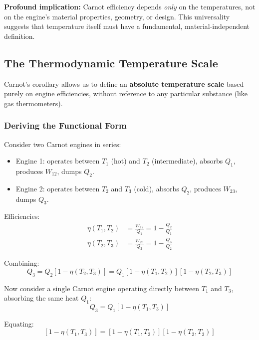 \documentclass[9pt,twocoloumn]{article}
\begin{document}
\textbf{Profound implication:} Carnot efficiency depends \emph{only} on the temperatures, not on the engine's material properties, geometry, or design. This universality suggests that temperature itself must have a fundamental, material-independent definition.

\subsection{The Thermodynamic Temperature Scale}

Carnot's corollary allows us to define an \textbf{absolute temperature scale} based purely on engine efficiencies, without reference to any particular substance (like gas thermometers).

\subsubsection{Deriving the Functional Form}

Consider two Carnot engines in series:
\begin{itemize}
    \item Engine 1: operates between $T_1$ (hot) and $T_2$ (intermediate), absorbs $Q_1$, produces $W_{12}$, dumps $Q_2$.
    \item Engine 2: operates between $T_2$ and $T_3$ (cold), absorbs $Q_2$, produces $W_{23}$, dumps $Q_3$.
\end{itemize}

Efficiencies:
\begin{align}
\eta(T_1, T_2) &= \frac{W_{12}}{Q_1} = 1 - \frac{Q_2}{Q_1} \\
\eta(T_2, T_3) &= \frac{W_{23}}{Q_2} = 1 - \frac{Q_3}{Q_2}
\end{align}

Combining:
\begin{equation}
Q_3 = Q_2 [1 - \eta(T_2, T_3)] = Q_1 [1 - \eta(T_1, T_2)] [1 - \eta(T_2, T_3)]
\end{equation}

Now consider a single Carnot engine operating directly between $T_1$ and $T_3$, absorbing the same heat $Q_1$:
\begin{equation}
Q_3 = Q_1 [1 - \eta(T_1, T_3)]
\end{equation}

Equating:
\begin{equation}
\boxed{[1 - \eta(T_1, T_3)] = [1 - \eta(T_1, T_2)] [1 - \eta(T_2, T_3)]}
\end{equation}
\end{document}
